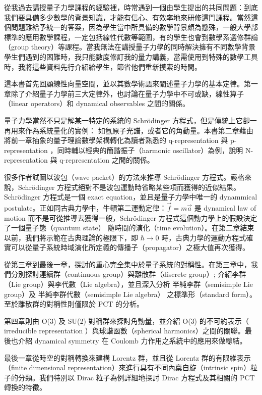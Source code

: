 \documentclass[a4paper,twoside,12pt]{book}
\begin{document}
從我過去講授量子力學課程的經驗裡，時常遇到一個由學生提出的共同問題：到底我們要具備多少數學的背景知識，才能有信心、有效率地來研修這門課程。當然這個問題難給予統一的答案，因為學生當中所具備的數學背景頗為懸殊，一般大學部標準的應用數學課程，一定包括線性代數等範圍，有的學生也會到數學系選修群論（group theory）等課程。當我無法在講授量子力學的同時解決擁有不同數學背景學生們遇到的困難時，我只能數度修訂我的量力講義，當需使用到特殊的數學工具時，我將這些資料先行介紹給學生，節省他們重新摸索的時間。

這本書首先回顧線性向量空間，並以其數學術語來闡述量子力學的基本定律。第一章除了介紹量子力學前三大定律外，也討論在量子力學中不可或缺，線性算子（linear operators）和 dynamical observables 之間的關係。

量子力學當然不只是解某一特定的系統的 Schr\"{o}dinger 方程式，但是傳統上它卻一再用來作為系統量化的實例： 如氫原子光譜，或者它的角動量。本書第二章藉由將前一章抽象的量子理論數學架構轉化為讀者熟悉的 q-representation 與 p-representation ，同時輔以經典的簡諧振子（harmonic oscillator）為例，說明 N-representation 與 q-representation 之間的關係。

很多作者試圖以波包（wave packet）的方法來推導 Schr\"{o}dinger 方程式。嚴格來說，Schr\"{o}dinger 方程式絕對不是波包運動時省略某些項而獲得的近似結果。Schr\"{o}dinger 方程式是一個 exact equation，並且是量子力學中唯一的 dynammical postulate。正如同古典力學中，牛頓第二運動定律：$\vec{f}=m\vec{a}$ 是 dynamical law of motion 而不是可從推導去獲得一般，Schr\"{o}dinger 方程式這個動力學上的假設決定了一個量子態（quantum state） 隨時間的演化（time evolution）。在第二章結束以前，我們將示範在古典理論的極限下，即 $\hbar\rightarrow 0$ 時，古典力學的運動方程式確實可以從量子系統時域演化所定義的傳播子（propagator）之極大值再次獲得。

從第三章到最後一章，探討的重心完全集中於量子系統的對稱性。在第三章中，我們分別探討連續群（continuous group）與離散群（discrete group）; 介紹李群（Lie group）與李代數（Lie algebra），並且深入分析 半純李群（semisimple Lie group）及 半純李群代數（semisimple Lie algebra） 之標準形（standard form）。至於離散群的對稱性則僅限於 PCT 的分析。

第四章則由 O(3) 及 SU(2) 對稱群來探討角動量，並介紹 O(3) 的不可約表示（	irreducible representation ）與球諧函數（spherical harmonics）之間的關聯。最後也介紹 dynamical symmetry 在 Coulomb 力作用之系統中的應用來做總結。

最後一章從時空的對稱轉換來建構 Lorentz 群，並且從 Lorentz 群的有限維表示（finite dimensional representation）來進行具有不同內稟自旋（intrinsic spin）粒子的分類。我們特別以 Dirac 粒子為例詳細地探討 Dirac 方程式及其相關的 PCT 轉換的特徵。
\end{document}
